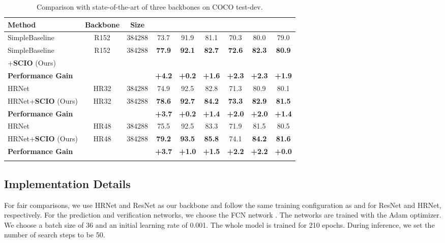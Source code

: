 \documentclass[runningheads]{llncs}
\begin{document}
\begin{table}[t]
\begin{center}
\caption{
Comparison with state-of-the-art of three backbones on COCO test-dev.
}
\label{tab:backbone}
\begin{tabular}{l|cccccccc}
\hline\noalign{\smallskip}
Method & Backbone & Size & \text{} &  &  &   &  &   \\
\hline\noalign{\smallskip}
SimpleBaseline \cite{DBLP:conf/eccv/XiaoWW18} & R152 &384288& 73.7& 91.9& 81.1 &70.3& 80.0 &79.0\\
SimpleBaseline & \multirow{2}{*}{R152} & \multirow{2}{*}{384288} & \multirow{2}{*}{\textbf{77.9}} & \multirow{2}{*}{\textbf{92.1}} & \multirow{2}{*}{\textbf{82.7}} & \multirow{2}{*}{\textbf{72.6}} & \multirow{2}{*}{\textbf{82.3}} & \multirow{2}{*}{\textbf{80.9}}\\
+\textbf{SCIO} (Ours)\\
\textbf{Performance Gain} &   &   & \textbf{+4.2} & \textbf{+0.2} & \textbf{+1.6} & \textbf{+2.3}& \textbf{+2.3} & \textbf{+1.9}\\
\hline\noalign{\smallskip}

HRNet \cite{DBLP:conf/cvpr/0009XLW19} & HR32& 384288& 74.9& 92.5& 82.8& 71.3& 80.9 &80.1\\
HRNet+\textbf{SCIO} (Ours) & HR32 & 384288 & \textbf{78.6} & \textbf{92.7} & \textbf{84.2} & \textbf{73.3} & \textbf{82.9} & \textbf{81.5}\\
\textbf{Performance Gain} &   &   & \textbf{+3.7} & \textbf{+0.2}  & \textbf{+1.4} & \textbf{+2.0}& \textbf{+2.0} & \textbf{+1.4}\\
\hline\noalign{\smallskip}

HRNet \cite{DBLP:conf/cvpr/0009XLW19} & HR48& 384288 &75.5& 92.5& 83.3& 71.9 &81.5& 80.5\\
HRNet+\textbf{SCIO} (Ours) & HR48 & 384288 & \textbf{79.2} &  \textbf{93.5} & \textbf{85.8} & 74.1 & \textbf{84.2} & \textbf{81.6}\\
\textbf{Performance Gain} & & & \textbf{+3.7} &\textbf{+1.0}&\textbf{+1.5}&\textbf{+2.2}&\textbf{+2.2}&\textbf{+0.0}\\
\hline\noalign{\smallskip}
\end{tabular}
\end{center}
\end{table}

\subsection{Implementation Details}
For fair comparisons, we use HRNet and ResNet as our backbone and follow the same training configuration as \cite{DBLP:conf/eccv/XiaoWW18} and \cite{DBLP:conf/cvpr/0009XLW19} for ResNet and HRNet, respectively. For the prediction and verification networks, we choose the FCN network \cite{long2015fully}.
The networks are  trained with the Adam optimizer. We choose a batch size of 36 and an initial learning rate of 0.001. The whole model is trained for 210 epochs. During inference, we set the number of search steps to be 50.
\end{document}
